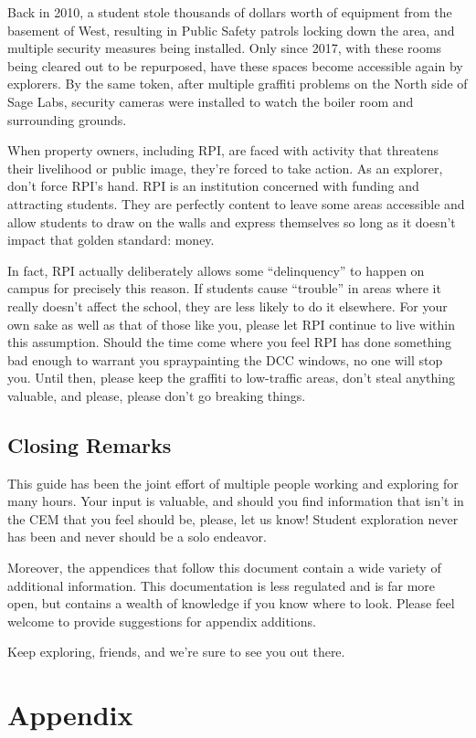 \documentclass{article}
\begin{document}
Back in 2010, a student stole thousands of dollars worth of equipment from the basement of West, resulting in Public Safety patrols locking down the area, and multiple security measures being installed. Only since 2017, with these rooms being cleared out to be repurposed, have these spaces become accessible again by explorers. By the same token, after multiple graffiti problems on the North side of Sage Labs, security cameras were installed to watch the boiler room and surrounding grounds. 

When property owners, including RPI, are faced with activity that threatens their livelihood or public image, they’re forced to take action. As an explorer, don’t force RPI’s hand. RPI is an institution concerned with funding and attracting students. They are perfectly content to leave some areas accessible and allow students to draw on the walls and express themselves so long as it doesn’t impact that golden standard: money. 

In fact, RPI actually deliberately allows some “delinquency” to happen on campus for precisely this reason. If students cause “trouble” in areas where it really doesn’t affect the school, they are less likely to do it elsewhere. For your own sake as well as that of those like you, please let RPI continue to live within this assumption. Should the time come where you feel RPI has done something bad enough to warrant you spraypainting the DCC windows, no one will stop you. Until then, please keep the graffiti to low-traffic areas, don’t steal anything valuable, and please, please don’t go breaking things.
\subsection{Closing Remarks}
This guide has been the joint effort of multiple people working and exploring for many hours. Your input is valuable, and should you find information that isn’t in the CEM that you feel should be, please, let us know! Student exploration never has been and never should be a solo endeavor.

Moreover, the appendices that follow this document contain a wide variety of additional information. This documentation is less regulated and is far more open, but contains a wealth of knowledge if you know where to look. Please feel welcome to provide suggestions for appendix additions.

Keep exploring, friends, and we’re sure to see you out there.
\pagebreak

\section{Appendix}
\end{document}
